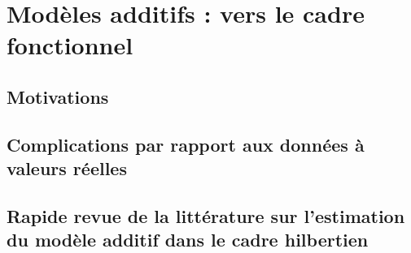 \chapter{Modèles additifs : vers le cadre fonctionnel}
\label{chap:additif_fda}
{   
    \minitoc%
    
    \section{Motivations}
    
    \section{Complications par rapport aux données à valeurs réelles}
    
    \section{Rapide revue de la littérature sur l'estimation du modèle additif dans le cadre hilbertien}
    
}